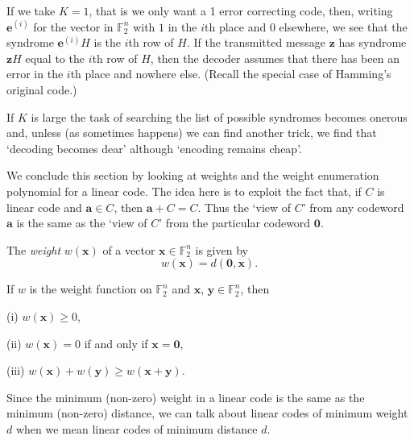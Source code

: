 If we take $K=1$, that is we only want a 1 error
correcting code, then, writing ${\mathbf e}^{(i)}$
for the vector in ${\mathbb F}_{2}^{n}$ with
$1$ in the $i$th place and $0$ elsewhere, we
see that the syndrome ${\mathbf e}^{(i)}H$
is the $i$th row of $H$. If the transmitted
message ${\mathbf z}$ has syndrome
${\mathbf z}H$ equal to the $i$th row of $H$,
then the decoder assumes that there has been an error
in the $i$th place and nowhere else.
(Recall the special case of Hamming's original code.)

If $K$ is large the task of searching the list
of possible syndromes becomes onerous and,
unless (as sometimes happens) we can find
another trick,
we find that `decoding becomes dear'
although `encoding remains cheap'.

We conclude this section by looking at weights
and the
weight enumeration polynomial for a linear code.
The idea here is to exploit the fact that, if
$C$ is linear code and ${\mathbf a}\in C$,
then ${\mathbf a}+C=C$. Thus the `view of $C$'
from any codeword ${\mathbf a}$ is the same
as the `view of $C$' from the particular codeword
${\boldsymbol 0}$.
\begin{definition} The \emph{weight} $w({\mathbf x})$
of a vector ${\mathbf x}\in{\mathbb F}_{2}^{n}$
is given by
\[w({\mathbf x})=d({\boldsymbol 0},{\mathbf x}).\]
\end{definition}
\begin{lemma} If $w$ is the weight function on
${\mathbb F}_{2}^{n}$ and
${\mathbf x},\,{\mathbf y}\in{\mathbb F}_{2}^{n}$,
then

(i) $w({\mathbf x})\geq 0$,

(ii) $w({\mathbf x})=0$ if and only if
${\mathbf x}={\boldsymbol 0}$,

(iii) $w({\mathbf x})+w({\mathbf y})\geq
w({\mathbf x}+{\mathbf y})$.
\end{lemma}

Since the minimum (non-zero) weight in a linear code
is the same as the minimum (non-zero)
distance, we can talk
about linear codes of minimum weight $d$
when we mean linear codes of minimum distance $d$.

